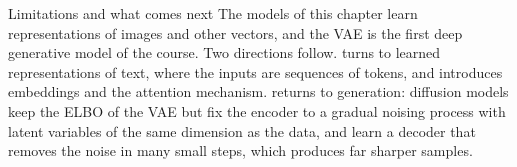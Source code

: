 \begin{notebox}{Limitations and what comes next}
The models of this chapter learn representations of images and other vectors, and the VAE is the first deep generative model of the course. Two directions follow.  turns to learned representations of text, where the inputs are sequences of tokens, and introduces embeddings and the attention mechanism.  returns to generation: diffusion models keep the ELBO of the VAE but fix the encoder to a gradual noising process with latent variables of the same dimension as the data, and learn a decoder that removes the noise in many small steps, which produces far sharper samples.
\end{notebox}
